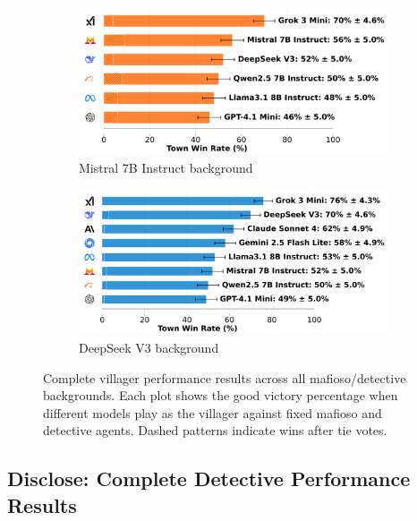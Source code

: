\documentclass{article}
\begin{document}
\begin{figure}[htbp]
    \begin{subfigure}[b]{0.48\textwidth}
        \centering
        \includegraphics[width=\textwidth]{../results/villager_mistral_7b_instruct_v4_1_benchmark.png}
        \caption{Mistral 7B Instruct background}
        \label{fig:villager_mistral_appendix}
    \end{subfigure}
    \hfill
    \begin{subfigure}[b]{0.48\textwidth}
        \centering
        \includegraphics[width=\textwidth]{../results/villager_deepseek_v3_v4_1_benchmark.png}
        \caption{DeepSeek V3 background}
        \label{fig:villager_deepseek_appendix}
    \end{subfigure}
    \caption{Complete villager performance results across all mafioso/detective backgrounds. Each plot shows the good victory percentage when different models play as the villager against fixed mafioso and detective agents. Dashed patterns indicate wins after tie votes.}
    \label{fig:villager_complete}
\end{figure}

\subsection{Disclose: Complete Detective Performance Results}
\end{document}

